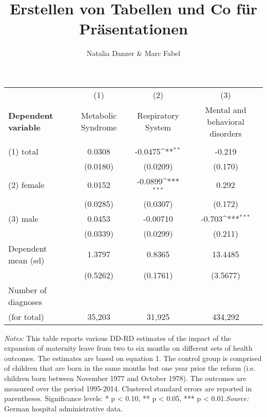 \documentclass{scrartcl} %
\author{Natalia Danzer \& Marc Fabel}
\title{Erstellen von Tabellen und Co für Präsentationen}
\begin{document}
\maketitle
\tableofcontents
\newpage

 \begin{table}[H]
 \begin{threeparttable} \centering 
 {\def\sym#1{\ifmmode^{#1}\else\(^{#1}\)\fi} 
 

\begin{tabular}{lccc}
\toprule
&\multicolumn{1}{c}{(1)}&\multicolumn{1}{c}{(2)}&\multicolumn{1}{c}{(3)}\\
\textbf{Dependent variable} & Metabolic Syndrome & Respiratory System & Mental and behavioral disorders \\ 
\midrule
\\
(1) {total} & 0.0308 & -0.0475\sym{**} & -0.219 \\ 
  & (0.0180) & (0.0209) & (0.170) \\ 
(2) {female} & 0.0152 & -0.0899\sym{***} & 0.292 \\  
 & (0.0285) & (0.0307) & (0.172) \\ 
(3) {male} & 0.0453 & -0.00710 & -0.703\sym{***} \\ 
& (0.0339) & (0.0299) & (0.211) \\
\midrule
Dependent mean (sd)&	1.3797	& 0.8365 & 13.4485 \\
& (0.5262) 		& (0.1761) & (3.5677) \\
Number of diagnoses  \\
(for total)& 35,203 & 31,925 & 434,292 \\
\bottomrule
\end{tabular}}
\begin{tablenotes} \item \scriptsize \emph{Notes:} This table reports various DD-RD estimates of the impact of the expansion of maternity leave from two to six months on different sets of health outcomes. The estimates are based on equation 1. The control group is comprised of children that are born in the same months but one year prior the reform (i.e. children born between November 1977 and October 1978). The outcomes are measured over the period 1995-2014. Clustered standard errors are reported in parentheses. Significance levels: * p < 0.10, ** p < 0.05, *** p < 0.01.\newline \emph{Source:} German hospital administrative data. \end{tablenotes} \end{threeparttable} \end{table} 
\end{document}
